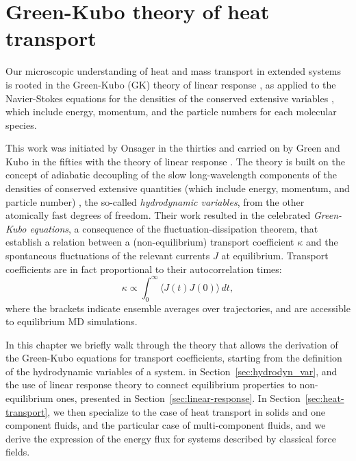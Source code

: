 \chapter{Green-Kubo theory of heat transport}  \label{ch:green-kubo}

Our microscopic understanding of heat and mass transport in extended systems is rooted in the Green-Kubo (GK) theory of linear response \cite{Green1954,Kubo1957a}, as applied to the Navier-Stokes equations for the densities of the conserved extensive variables \cite{Kadanoff1963,Forster1975}, which include energy, momentum, and the particle numbers for each molecular species. 
\begin{LEtext}

This work was initiated by Onsager in the thirties \cite{Onsager1931a,Onsager1931b} and carried on by Green and Kubo in the fifties with the theory of linear response \cite{Green1952,Green1954,Kubo1957a,Kubo1957b}. The theory is built on the concept of adiabatic decoupling of the slow long-wavelength components of the densities of conserved extensive quantities (which include energy, momentum, and particle number) \cite{Kadanoff1963}, the so-called \emph{hydrodynamic variables}, from the other atomically fast degrees of freedom. Their work resulted in the celebrated \emph{Green-Kubo equations}, a consequence of the fluctuation-dissipation theorem, that establish a relation between a (non-equilibrium) transport coefficient $\kappa$ and the spontaneous fluctuations of the relevant currents $J$ at equilibrium. Transport coefficients are in fact proportional to their autocorrelation times:
\begin{equation}
\kappa\propto\int_{0}^{\infty}\!\langle{J}(t){J}(0)\rangle\, dt, \label{eq:GK}
\end{equation}
where the brackets indicate ensemble averages over trajectories, and are accessible to equilibrium MD simulations.

In this chapter we briefly walk through the theory that allows the derivation of the Green-Kubo equations for transport coefficients, starting from the definition of the hydrodynamic variables of a system. in Section~\ref{sec:hydrodyn_var}, and the use of linear response theory to connect equilibrium properties to non-equilibrium ones, presented in Section~\ref{sec:linear-response}. In Section~\ref{sec:heat-transport}, we then specialize to the case of heat transport in solids and one component fluids, and the particular case of multi-component fluids, and we derive the expression of the energy flux for systems described by classical force fields.
\end{LEtext}


